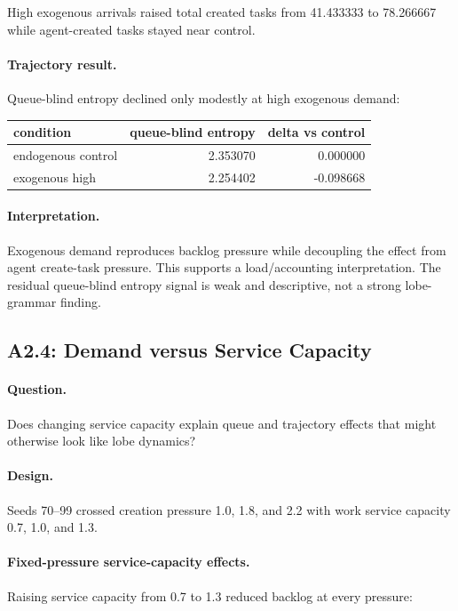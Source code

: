 \documentclass[11pt]{article}
\begin{document}
High exogenous arrivals raised total created tasks from 41.433333 to 78.266667
while agent-created tasks stayed near control.

\paragraph{Trajectory result.}
Queue-blind entropy declined only modestly at high exogenous demand:

\begin{center}
\begin{tabular}{lrr}
condition & queue-blind entropy & delta vs control \\
\hline
endogenous control & 2.353070 & 0.000000 \\
exogenous high & 2.254402 & -0.098668
\end{tabular}
\end{center}

\paragraph{Interpretation.}
Exogenous demand reproduces backlog pressure while decoupling the effect from
agent create-task pressure. This supports a load/accounting interpretation. The
residual queue-blind entropy signal is weak and descriptive, not a strong
lobe-grammar finding.

\subsection{A2.4: Demand versus Service Capacity}

\paragraph{Question.}
Does changing service capacity explain queue and trajectory effects that might
otherwise look like lobe dynamics?

\paragraph{Design.}
Seeds 70--99 crossed creation pressure 1.0, 1.8, and 2.2 with work service
capacity 0.7, 1.0, and 1.3.

\paragraph{Fixed-pressure service-capacity effects.}
Raising service capacity from 0.7 to 1.3 reduced backlog at every pressure:
\end{document}
